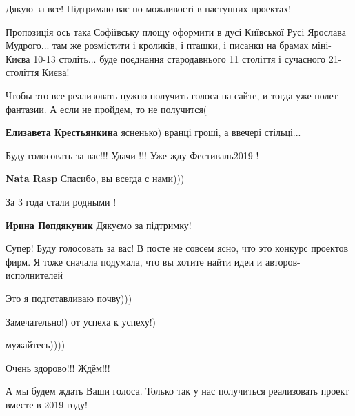
Дякую за все! Підтримаю вас по можливості в наступних проектах!


Пропозиція ось така🌝Софіївську площу оформити в дусі Київської Русі Ярослава
Мудрого... там же розмістити і кроликів, і пташки, і писанки на брамах
міні-Києва 10-13 століть... буде поєднання стародавнього 11 століття і
сучасного 21-століття Києва!

\begin{itemize} %

Чтобы это все реализовать нужно получить голоса на сайте, и тогда уже полет
фантазии. А если не пройдем, то не получится(

\textbf{Елизавета Крестьянкина} ясненько) вранці гроші, а ввечері стільці...🤩


Буду голосовать за вас!!! Удачи !!! Уже жду Фестиваль2019 !

\textbf{Nata Rasp} Спасибо, вы всегда с нами)))


За 3 года стали родными ! 🙂

\textbf{Ирина Попдякуник} Дякуємо за підтримку!

\end{itemize} %


Супер! Буду голосовать за вас! В посте не совсем ясно, что это конкурс проектов
фирм. Я тоже сначала подумала, что вы хотите найти идеи и авторов-исполнителей


Это я подготавливаю почву)))


Замечательно!) от успеха к успеху!)


мужайтесь))))


Очень здорово!!! Ждём!!!


А мы будем ждать Ваши голоса. Только так у нас получиться реализовать проект
вместе в 2019 году!


